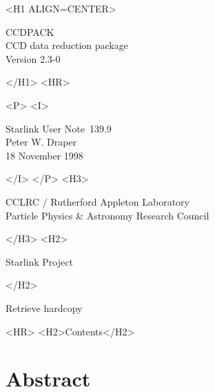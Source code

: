 \documentclass[twoside,11pt]{article}
\newcommand{\stardoccategory}  {Starlink User Note}
\newcommand{\stardocsource}    {sun\stardocnumber}
\newcommand{\stardocnumber}    {139.9}
\newcommand{\stardocauthors}   {Peter W. Draper}
\newcommand{\stardocdate}      {18 November 1998}
\newcommand{\stardoctitle}     {CCDPACK}
\newcommand{\stardoconeline}   {CCD data reduction package}
\newcommand{\stardocversion}   {Version 2.3-0}
\newcommand{\htmladdnormallink}[2]{#1}
\newcommand{\htmladdimg}[1]{}
\newcommand{\htmlref}[2]{#1}
\newcommand{\htmladdtonavigation}[1]{}
\newcommand{\xlabel}[1]{}
\renewcommand{\_}{\texttt{\symbol{95}}}
\begin{document}
\begin{htmlonly}
   \xlabel{}
   \begin{rawhtml} <H1 ALIGN=CENTER> \end{rawhtml}
      \stardoctitle\\
      \stardoconeline \\
      \stardocversion

      \htmladdimg{main.gif}
   \begin{rawhtml} </H1> <HR> \end{rawhtml}


   \begin{rawhtml} <P> <I> \end{rawhtml}
   \stardoccategory\ \stardocnumber \\
   \stardocauthors \\
   \stardocdate
   \begin{rawhtml} </I> </P> <H3> \end{rawhtml}
      \htmladdnormallink{CCLRC}{http://www.cclrc.ac.uk} /
      \htmladdnormallink{Rutherford Appleton Laboratory}
                        {http://www.cclrc.ac.uk/ral} \\
      \htmladdnormallink{Particle Physics \& Astronomy Research Council}
                        {http://www.pparc.ac.uk} \\
   \begin{rawhtml} </H3> <H2> \end{rawhtml}
      \htmladdnormallink{Starlink Project}{http://star-www.rl.ac.uk/}
   \begin{rawhtml} </H2> \end{rawhtml}
   \htmladdnormallink{\htmladdimg{source.gif} Retrieve hardcopy}
      {http://star-www.rl.ac.uk/cgi-bin/hcserver?\stardocsource}\\

  \label{stardoccontents}
  \begin{rawhtml} 
    <HR>
    <H2>Contents</H2>
  \end{rawhtml}
  \htmladdtonavigation{\htmlref{\htmladdimg{contents_motif.gif}}
        {stardoccontents}}

  \section{\xlabel{abstract}Abstract}
\end{htmlonly}
\end{document}
